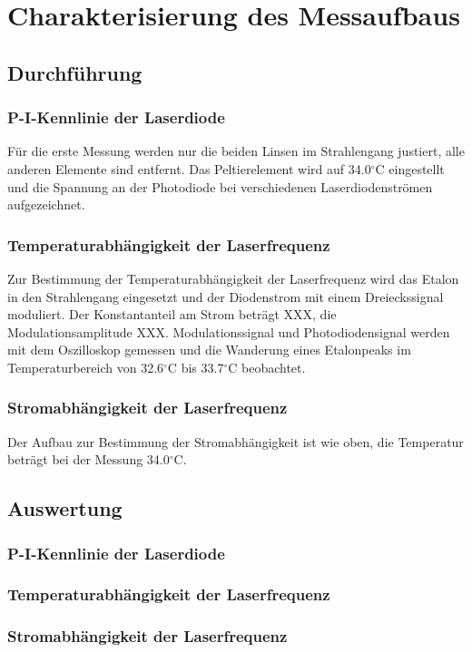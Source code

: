 \section{Charakterisierung des Messaufbaus}
\subsection{Durchführung}
\subsubsection*{P-I-Kennlinie der Laserdiode}
Für die erste Messung werden nur die beiden Linsen im Strahlengang justiert, alle anderen Elemente sind entfernt. 
Das Peltierelement wird auf 34.0$^\circ$C eingestellt und die Spannung an der
Photodiode bei verschiedenen Laserdiodenströmen aufgezeichnet.

\subsubsection*{Temperaturabhängigkeit der Laserfrequenz}
Zur Bestimmung der Temperaturabhängigkeit der
Laserfrequenz wird das Etalon in den Strahlengang eingesetzt und der Diodenstrom mit einem Dreieckssignal
moduliert. Der Konstantanteil am Strom beträgt XXX, die Modulationsamplitude XXX.
Modulationssignal und Photodiodensignal werden mit dem Oszilloskop gemessen und die Wanderung eines Etalonpeaks
im Temperaturbereich von 32.6$^\circ$C bis 33.7$^\circ$C beobachtet.

\subsubsection*{Stromabhängigkeit der Laserfrequenz} Der Aufbau zur Bestimmung der Stromabhängigkeit ist wie oben,
die Temperatur beträgt bei der Messung 34.0$^\circ$C.

\subsection{Auswertung}
\subsubsection*{P-I-Kennlinie der Laserdiode}

\subsubsection*{Temperaturabhängigkeit der Laserfrequenz}

\subsubsection*{Stromabhängigkeit der Laserfrequenz} 